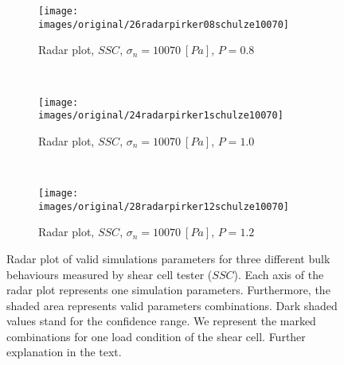 \begin{figure}[htp] \centering
        \begin{subfigure}[b]{0.5\columnwidth}
        \texttt{[image: images/original/26radarpirker08schulze10070]}
        \caption{Radar plot, $SSC$, $\sigma_n=10070 ~[Pa]$, $P=0.8$}
        \label{fig:26radarpirker08schulze10070} 
    \end{subfigure}\\
     \begin{subfigure}[b]{0.5\columnwidth}
        \texttt{[image: images/original/24radarpirker1schulze10070]}
        \caption{Radar plot, $SSC$, $\sigma_n=10070 ~[Pa]$, $P=1.0$}
        \label{fig:24radarpirker1schulze10070}
    \end{subfigure} \\
        \begin{subfigure}[b]{0.5\columnwidth}
        \texttt{[image: images/original/28radarpirker12schulze10070]}
        \caption{Radar plot, $SSC$, $\sigma_n=10070 ~[Pa]$, $P=1.2$}
        \label{fig:28radarpirker12schulze10070} 
    \end{subfigure}
    \caption[Radar plot of valid simulations parameters for three different
    bulk behaviours measured by SCT]{Radar plot of valid simulations parameters for three different
    bulk behaviours measured by shear cell tester ($SSC$).
    Each axis of the radar plot represents one simulation parameters.
    Furthermore, the shaded area represents valid parameters combinations.
    Dark shaded values stand for the confidence range.
    We represent the marked combinations for one load condition of the shear
    cell.
    Further explanation in the text.
   }
    \label{fig:29schulzeradarandcloud}
\end{figure}